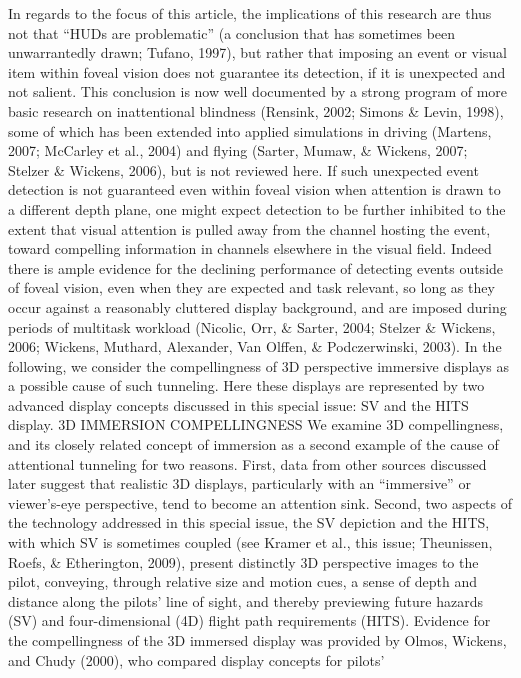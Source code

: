 \documentclass[utf8,bachelor,manualbib]{gradu3}
\begin{document}
In regards to the focus of this article, the implications of this research are thus
not that “HUDs are problematic” (a conclusion that has sometimes been unwarrantedly
drawn; Tufano, 1997), but rather that imposing an event or visual item
within foveal vision does not guarantee its detection, if it is unexpected and not salient.
This conclusion is now well documented by a strong program of more basic
research on inattentional blindness (Rensink, 2002; Simons \& Levin, 1998), some
of which has been extended into applied simulations in driving (Martens, 2007;
McCarley et al., 2004) and flying (Sarter, Mumaw, \& Wickens, 2007; Stelzer \&
Wickens, 2006), but is not reviewed here.
If such unexpected event detection is not guaranteed even within foveal vision
when attention is drawn to a different depth plane, one might expect detection to be further inhibited to the extent that visual attention is pulled away from the channel
hosting the event, toward compelling information in channels elsewhere in the visual
field. Indeed there is ample evidence for the declining performance of detecting
events outside of foveal vision, even when they are expected and task relevant,
so long as they occur against a reasonably cluttered display background, and are
imposed during periods of multitask workload (Nicolic, Orr, \& Sarter, 2004;
Stelzer \& Wickens, 2006; Wickens, Muthard, Alexander, Van Olffen, \& Podczerwinski,
2003). In the following, we consider the compellingness of 3D perspective
immersive displays as a possible cause of such tunneling. Here these displays
are represented by two advanced display concepts discussed in this special
issue: SV and the HITS display. 3D IMMERSION COMPELLINGNESS
We examine 3D compellingness, and its closely related concept of immersion as a
second example of the cause of attentional tunneling for two reasons. First, data
from other sources discussed later suggest that realistic 3D displays, particularly
with an “immersive” or viewer’s-eye perspective, tend to become an attention sink.
Second, two aspects of the technology addressed in this special issue, the SV depiction
and the HITS, with which SV is sometimes coupled (see Kramer et al., this
issue; Theunissen, Roefs, \& Etherington, 2009), present distinctly 3D perspective
images to the pilot, conveying, through relative size and motion cues, a sense of
depth and distance along the pilots’ line of sight, and thereby previewing future
hazards (SV) and four-dimensional (4D) flight path requirements (HITS).
Evidence for the compellingness of the 3D immersed display was provided by
Olmos, Wickens, and Chudy (2000), who compared display concepts for pilots’
\end{document}
